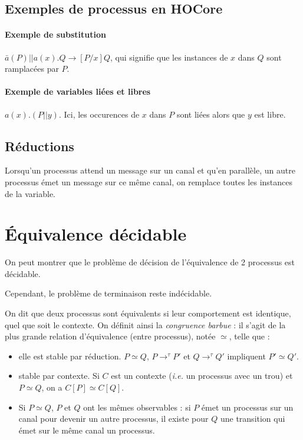 \documentclass{article}
\def\barbue{\simeq}
\begin{document}
\subsection{Exemples de processus en HOCore}
\paragraph{Exemple de substitution} $\bar{a}(P)||a(x).Q \rightarrow [P/x]Q$, qui signifie que les instances de $x$ dans $Q$ sont ramplacées par $P$.
\paragraph{Exemple de variables liées et libres} $a(x).(P||y)$. Ici, les occurences de $x$ dans $P$ sont liées alors que $y$ est libre. %




\subsection{Réductions}
Lorsqu'un processus attend un message sur un canal et qu'en parallèle, un autre processus émet un message sur ce même canal, on remplace toutes les instances de la variable.




\section{Équivalence décidable}
On peut montrer que le problème de décision de l'équivalence de 2 processus est décidable.

Cependant, le problème de terminaison reste indécidable.

On dit que deux processus sont équivalents si leur comportement est identique, quel que soit le contexte. On définit ainsi la \textit{congruence barbue} : il s'agit de la plus grande relation d'équivalence (entre processus), notée $\barbue$, telle que :
\begin{itemize}
\item elle est stable par réduction. $P\barbue Q$, $P\rightarrow^\tau P'$ et $Q\rightarrow^\tau Q'$ impliquent $P'\barbue Q'$.
\item stable par contexte. Si $C$ est un contexte (\textit{i.e.} un processus avec un trou) et $P\barbue Q$, on a $C[P]\barbue C[Q]$. 
\item Si $P\barbue Q$, $P$ et $Q$ ont les mêmes observables : si $P$ émet un processus sur un canal pour devenir un autre processus, il existe pour $Q$ une transition qui émet sur le même canal un processus.
\end{itemize}
\end{document}
